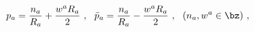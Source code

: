 \begin{equation}
p_a = \frac{n_a}{R_a}+\frac{w^a R_a}{2}~,~~
\bar{p}_a = \frac{n_a}{R_a}-\frac{w^a R_a}{2}~,~~ (n_a, w^a \in \bz)~,
\label{T4 momenta}
\end{equation}

